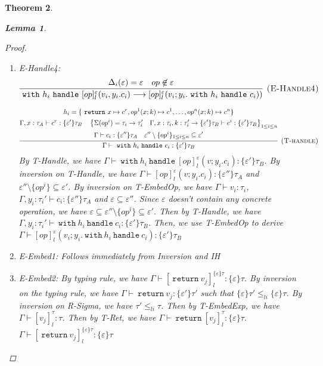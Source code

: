 \documentclass{article}
\newtheorem{theorem}{Theorem}[section]
\newtheorem{lemma}[theorem]{Lemma}
\newcommand{\m}[1]{\ \texttt{#1}\ }
\begin{document}
\begin{theorem}
\begin{lemma}
\begin{proof}
\begin{enumerate}
\item E-Handle4:
$$
\infer[\textsc{(E-Handle4)}]
  {\m{with} h_i \m{handle} [op]^\varepsilon_l(v_i, y_i.c_i) \longrightarrow [op]^\varepsilon_l(v_i; y_i. \m{with} h_i \m{handle} c_i))}
  {\Delta_i(\varepsilon) = \varepsilon & op \not \in \varepsilon} 
$$

$$
\infer[\textsc{(T-handle)}]
  {\Gamma\vdash \m{with} h_i \m{handle} c_i: \{\varepsilon'\} \tau_B}
  {\begin{gathered}
  h_i = \{\m{return} x \mapsto c^r, op^1(x;k) \mapsto c^1, \dots, op^n(x;k) \mapsto c^n \}\\
  \Gamma, x: \tau_A \vdash c^r : \{\varepsilon'\}\tau_B \quad
  \left\{ \Sigma(op^i) = \tau_i \rightarrow \tau_i'  \quad \Gamma, x:\tau_i, k:\tau_i' \rightarrow \{\varepsilon'\}\tau_B \vdash c^i: \{\varepsilon'\}\tau_B    \right\}_{1 \leq i \leq n} \\
  \Gamma \vdash c_i : \{\varepsilon''\}\tau_A \quad \varepsilon'' \setminus \{op^i\}_{1 \leq i \leq n} \subseteq \varepsilon'
  \end{gathered}}
$$
By T-Handle, we have $\Gamma \vdash \m{with} h_i \m{handle} [op]^\varepsilon_l(v;y_i.c_i) :  \{\varepsilon'\}\tau_B$. By inversion on T-Handle, we have $\Gamma \vdash [op]^\varepsilon_l(v;y_i.c_i): \{\varepsilon''\}\tau_A$ and $\varepsilon'' \setminus \{op^i\} \subseteq \varepsilon'$. By inversion on T-EmbedOp, we have $\Gamma \vdash v_i: \tau_i$, $\Gamma, y_i:\tau_i' \vdash c_i : \{\varepsilon''\}\tau_A$ and $\varepsilon \subseteq \varepsilon''$. Since $\varepsilon$ doesn't contain any concrete operation, we have $\varepsilon \subseteq  \varepsilon'' \setminus \{op^i\} \subseteq \varepsilon' $. Then by T-Handle, we have $\Gamma, y_i: \tau_i' \vdash \m{with} h_i \m{handle} c_i : \{\varepsilon'\}\tau_B$. Then, we use T-EmbedOp to derive $\Gamma \vdash [op]^\varepsilon_l(v_i; y_i. \m{with} h_i \m{handle} c_i) : \{\varepsilon'\}\tau_B$


\item E-Embed1: Follows immediately from Inversion and IH
\item E-Embed2: By typing rule, we have $\Gamma \vdash [\m{return} v_j]^{\{\varepsilon\}\tau}_l :\{\varepsilon\}\tau$. By inversion on the typing rule, we have $\Gamma \vdash \m{return} v_j : \{\varepsilon'\}\tau'$ such that $\{\varepsilon\}\tau' \leq_{li} \{\varepsilon\}\tau$. By inversion on R-Sigma, we have $\tau' \leq_{li} \tau$. Then by T-EmbedExp, we have $\Gamma \vdash [v_j]^\tau_l : \tau$. Then by T-Ret, we have $\Gamma \vdash \m{return}  [v_j]^\tau_l : \{\varepsilon\}\tau$. $\Gamma \vdash [\m{return} v_j]^{\{\varepsilon\}\tau}_l :\{\varepsilon\}\tau$


\end{enumerate}
\end{proof}
\end{lemma}
\end{theorem}
\end{document}
